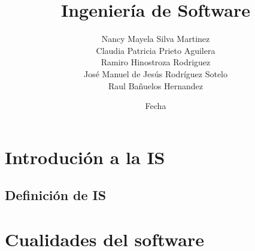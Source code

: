 \documentclass{book}
\title{Ingenier\'ia de Software}
\author{ Nancy Mayela Silva Martinez \\ Claudia Patricia Prieto Aguilera \\ Ramiro Hinostroza Rodriguez\\  José Manuel de Jesús Rodríguez Sotelo \\ Raul Bañuelos Hernandez \\ }
\date{Fecha}
\begin{document}
\maketitle

\chapter{Introduci\'on a la IS}

\section{ Definici\'on de IS}

%


\chapter{Cualidades del software}


%

\end{document}
